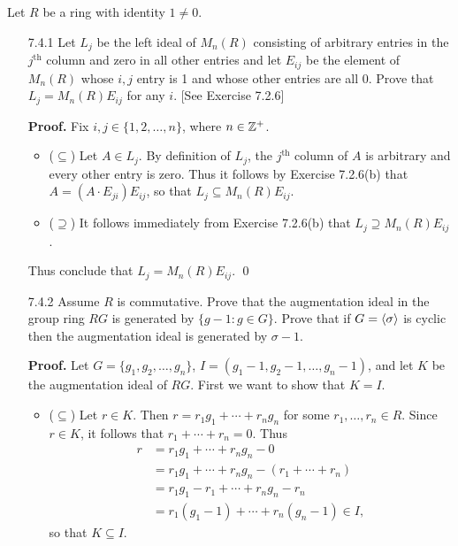 Let $R$ be a ring with identity $1 \neq 0$.
\begin{enumerate}
   \item[7.4.1]   Let $L_j$ be the left ideal of $M_n(R)$ consisting of
                  arbitrary entries in the $j^{\text{th}}$ column and zero in
                  all other entries and let $E_{ij}$ be the element of $M_n(R)$
                  whose $i, j$ entry is 1 and whose other entries are all 0. 
                  Prove that $L_j = M_n(R)E_{ij}$ for any $i$.
                  [See Exercise 7.2.6]

      \textbf{Proof.} Fix $i, j \in \{1, 2, \ldots, n\}$, where $n \in \mathbb{Z}^+$.

      \begin{itemize}
         \item ($\subseteq$) Let $A \in L_j$. By definition of $L_j$, the
               $j^{\text{th}}$ column of $A$ is arbitrary and every other entry 
               is zero. Thus it follows by Exercise 7.2.6(b) that
               $A = (A\cdot E_{ji})E_{ij}$, so that
               $L_j \subseteq M_n(R)E_{ij}$.

         \item ($\supseteq$) It follows immediately from Exercise 7.2.6(b) that
               $L_j \supseteq M_n(R)E_{ij}$.
      \end{itemize}
      Thus conclude that $L_j = M_n(R)E_{ij}$. \qed
   \item[7.4.2]   Assume $R$ is commutative. Prove that the augmentation ideal
                  in the group ring $RG$ is generated by $\{g - 1 : g \in G\}$.
                  Prove that if $G = \langle \sigma \rangle$ is cyclic then the 
                  augmentation ideal is generated by $\sigma - 1$.

      \textbf{Proof.} Let $G = \{g_1, g_2, \ldots, g_n\}$,
      $I = (g_1 - 1, g_2 - 1, \ldots, g_n - 1)$, and let $K$ be the augmentation 
      ideal of $RG$. First we want to show that $K = I$.

      \begin{itemize}
         \item ($\subseteq$) Let $r \in K$. Then $r = r_1g_1 + \cdots + r_ng_n$
               for some $r_1, \ldots, r_n \in R$. Since $r \in K$, it follows
               that $r_1 + \cdots + r_n = 0$. Thus
               \begin{align*}
                  r &= r_1g_1 + \cdots + r_ng_n - 0 \\
                    &= r_1g_1 + \cdots + r_ng_n - (r_1 + \cdots + r_n) \\
                    &= r_1g_1 - r_1 + \cdots + r_ng_n - r_n \\
                    &= r_1(g_1 - 1) + \cdots + r_n(g_n - 1) \in I,
               \end{align*}
               so that $K \subseteq I$.


\end{itemize}
\end{enumerate}
